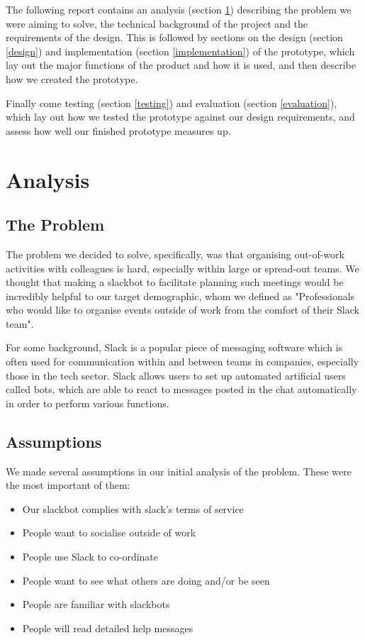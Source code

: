 \documentclass[12pt]{report}
\begin{document}
\vspace{3mm}

The following report contains an analysis (section \ref{analysis}) describing the problem we were aiming to solve, the technical background of the project and the requirements of the design. This is followed by sections on the design (section \ref{design}) and implementation (section \ref{implementation}) of the prototype, which lay out the major functions of the product and how it is used, and then describe how we created the prototype.

\vspace{3mm}

Finally come testing (section \ref{testing}) and evaluation (section \ref{evaluation}), which lay out how we tested the prototype against our design requirements, and assess how well our finished prototype measures up.

\section{Analysis}\label{analysis}
\subsection{The Problem}
The problem we decided to solve, specifically, was that organising out-of-work activities with colleagues is hard, especially within large or spread-out teams. We thought that making a slackbot to facilitate planning such meetings would be incredibly helpful to our target demographic, whom we defined as "Professionals who would like to organise events outside of work from the comfort of their Slack team".

For some background, Slack is a popular piece of messaging software which is often used for communication within and between teams in companies, especially those in the tech sector. Slack allows users to set up automated artificial users called bots, which are able to react to messages posted in the chat automatically in order to perform various functions.

\subsection{Assumptions}\label{assumptions}
We made several assumptions in our initial analysis of the problem. These were the most important of them:

\begin{itemize}
	\item Our slackbot complies with slack's terms of service
	\item People want to socialise outside of work
	\item People use Slack to co-ordinate
	\item People want to see what others are doing and/or be seen
	\item People are familiar with slackbots
	\item People will read detailed help messages
\end{itemize}
\end{document}
